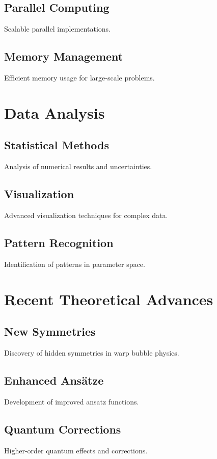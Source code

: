 \documentclass{article}
\begin{document}
\subsection{Parallel Computing}
Scalable parallel implementations.

\subsection{Memory Management}
Efficient memory usage for large-scale problems.

\section{Data Analysis}

\subsection{Statistical Methods}
Analysis of numerical results and uncertainties.

\subsection{Visualization}
Advanced visualization techniques for complex data.

\subsection{Pattern Recognition}
Identification of patterns in parameter space.

\section{Recent Theoretical Advances}

\subsection{New Symmetries}
Discovery of hidden symmetries in warp bubble physics.

\subsection{Enhanced Ansätze}
Development of improved ansatz functions.

\subsection{Quantum Corrections}
Higher-order quantum effects and corrections.
\end{document}
